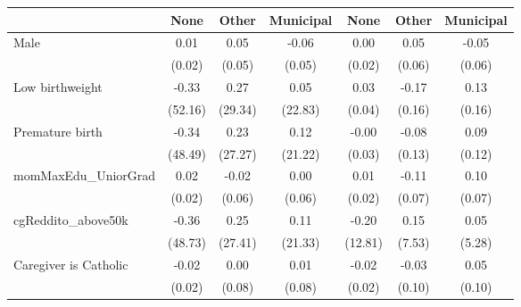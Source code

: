 {
\def\sym#1{\ifmmode^{#1}\else\(^{#1}\)\fi}
\begin{tabular}{l*{6}{c}}
\toprule
                    &\multicolumn{1}{c}{None}&\multicolumn{1}{c}{Other}&\multicolumn{1}{c}{Municipal}&\multicolumn{1}{c}{None}&\multicolumn{1}{c}{Other}&\multicolumn{1}{c}{Municipal}\\
\midrule
Male                &        0.01         &        0.05         &       -0.06         &        0.00         &        0.05         &       -0.05         \\
                    &      (0.02)         &      (0.05)         &      (0.05)         &      (0.02)         &      (0.06)         &      (0.06)         \\
\addlinespace
Low birthweight     &       -0.33         &        0.27         &        0.05         &        0.03         &       -0.17         &        0.13         \\
                    &     (52.16)         &     (29.34)         &     (22.83)         &      (0.04)         &      (0.16)         &      (0.16)         \\
\addlinespace
Premature birth     &       -0.34         &        0.23         &        0.12         &       -0.00         &       -0.08         &        0.09         \\
                    &     (48.49)         &     (27.27)         &     (21.22)         &      (0.03)         &      (0.13)         &      (0.12)         \\
\addlinespace
momMaxEdu\_UniorGrad &        0.02         &       -0.02         &        0.00         &        0.01         &       -0.11         &        0.10         \\
                    &      (0.02)         &      (0.06)         &      (0.06)         &      (0.02)         &      (0.07)         &      (0.07)         \\
\addlinespace
cgReddito\_above50k  &       -0.36         &        0.25         &        0.11         &       -0.20         &        0.15         &        0.05         \\
                    &     (48.73)         &     (27.41)         &     (21.33)         &     (12.81)         &      (7.53)         &      (5.28)         \\
\addlinespace
Caregiver is Catholic&       -0.02         &        0.00         &        0.01         &       -0.02         &       -0.03         &        0.05         \\
                    &      (0.02)         &      (0.08)         &      (0.08)         &      (0.02)         &      (0.10)         &      (0.10)         \\

\end{tabular}}

